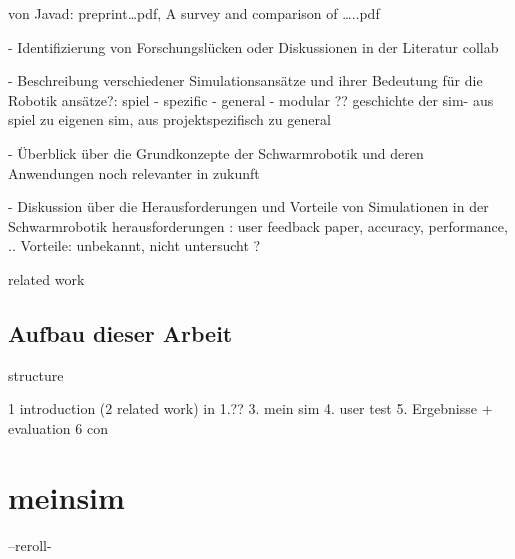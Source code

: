 \documentclass[german,version-2020-11]{uzl-thesis}
\begin{document}
von Javad: preprint…pdf, A survey and comparison of …..pdf
      


- Identifizierung von Forschungslücken oder Diskussionen in der Literatur   
collab


- Beschreibung verschiedener Simulationsansätze und ihrer Bedeutung für die Robotik
    ansätze?: spiel - spezific - general - modular ??
    geschichte der sim- aus spiel zu eigenen sim, aus projektspezifisch zu general


- Überblick über die Grundkonzepte der Schwarmrobotik und deren Anwendungen
    noch relevanter in zukunft


- Diskussion über die Herausforderungen und Vorteile von Simulationen in der Schwarmrobotik
    herausforderungen : user feedback paper, accuracy, performance, ..
    Vorteile: unbekannt, nicht untersucht ?


related work

\section{Aufbau dieser Arbeit}


%

structure 

1 introduction
(2 related work) in 1.??
3. mein sim
4. user test
5. Ergebnisse + evaluation
6 con









%

\chapter{meinsim}%
\label{chapter-use}



   
   --reroll-
   
\end{document}
